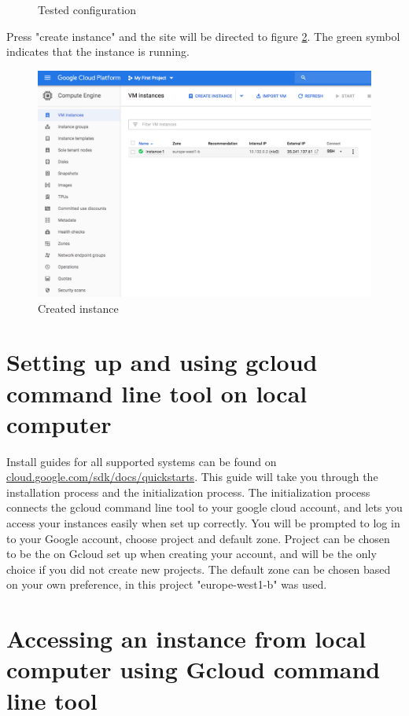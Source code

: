 \begin{figure}
    \caption{Tested configuration}
    \label{fig:gcloud2}
\end{figure}

Press "create instance" and the site will be directed to figure \ref{fig:created_instance}. The green symbol indicates that the instance is running.

\begin{figure}
    \centering
    \includegraphics[scale=0.5]{images/created_instance.png}
    \caption{Created instance}
    \label{fig:created_instance}
\end{figure}
\newpage

\section{Setting up  and using gcloud command line tool on local computer}

Install guides for all supported systems can be found on \url{cloud.google.com/sdk/docs/quickstarts}. This guide will take you through the installation process and the initialization process. The initialization process connects the gcloud command line tool to your google cloud account, and lets you access your instances easily when set up correctly. You will be prompted to log in to your Google account, choose project and default zone. Project can be chosen to be the on Gcloud set up when creating your account, and will be the only choice if you did not create new projects. The default zone can be chosen based on your own preference, in this project "europe-west1-b" was used. 

\section{Accessing an instance from local computer using Gcloud command line tool}

